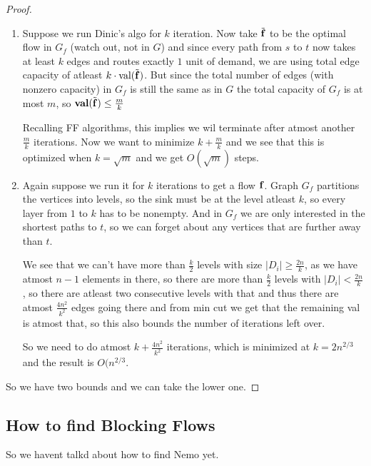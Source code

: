 \begin{proof}
    \begin{enumerate}
        \item Suppose we run Dinic's algo for $k$ iteration. Now take $\Tilde{\mathbf{f}}$ to be the optimal flow in $G_f$ (watch out, not in $G$) and since every path from $s$ to $t$ now takes at least $k$ edges and routes exactly $1$ unit of demand, we are using total edge capacity of 
        atleast $k \cdot \text{val} (\Tilde{\mathbf{f}})$. But since the total number of edges (with nonzero capacity) in $G_f$ is still the same as in $G$ 
        the total capacity of $G_f$ is at most $m$, so 
        $\textbf{val} (\Tilde{\mathbf{f}}) \leq \frac{m}{k}$

        Recalling FF algorithms, this implies we wil terminate after atmost another $\frac m k$ iterations. Now we want to minimize $k + \frac m k$ and we see that this is optimized when $k = \sqrt{m}$ and we get $O(\sqrt{m})$ steps.

        \item Again suppose we run it for $k$ iterations to get a flow $\mathbf{f}$. Graph $G_f$ partitions the vertices into levels, so the sink must be at the level atleast $k$, so every layer from $1$ to $k$ has to be nonempty. And in $G_f$ we are only interested in the shortest paths to $t$, so we can forget about any vertices that are further away than $t$.

        We see that we can't have more than $\frac k 2$ levels with size $|D_i| \geq \frac{2n}{k}$, as we have atmost $n-1$ elements in there, so there are more than $\frac k 2$ levels with $|D_i| < \frac{2n}{k}$, so there are atleast two consecutive levels with that and thus there are atmost $\frac{4n^2}{k^2}$ edges going there and from min cut we get that the remaining val is atmost that, so this also bounds the number of iterations left over.

        So we need to do atmost $k + \frac{4n^2}{k^2}$ iterations, which is minimized at $k = 2n^{2/3}$ and the result is $O(n^{2/3}$.
    \end{enumerate}
    So we have two bounds and we can take the lower one.
\end{proof}


\subsection{How to find Blocking Flows}

So we havent talkd about how to find Nemo yet.

